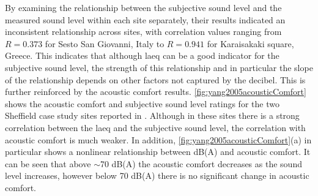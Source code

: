 By examining the relationship between the subjective sound level and the measured sound level within each site separately, their results indicated an inconsistent relationship across sites, with correlation values ranging from $R=0.373$ for Sesto San Giovanni, Italy to $R=0.941$ for Karaisakaki square, Greece. This indicates that although \gls{laeq} can be a good indicator for the subjective sound level, the strength of this relationship and in particular the slope of the relationship depends on other factors not captured by the decibel. This is further reinforced by the acoustic comfort results. \cref{fig:yang2005acousticComfort} shows the acoustic comfort and subjective sound level ratings for the two Sheffield case study sites reported in \citet{Yang2005Acoustic}. Although in these sites there is a strong correlation between the \gls{laeq} and the subjective sound level, the correlation with acoustic comfort is much weaker. In addition, \cref{fig:yang2005acousticComfort}(a) in particular shows a nonlinear relationship between dB(A) and acoustic comfort. It can be seen that above $\sim$70 dB(A) the acoustic comfort decreases as the sound level increases, however below 70 dB(A) there is no significant change in acoustic comfort. 


